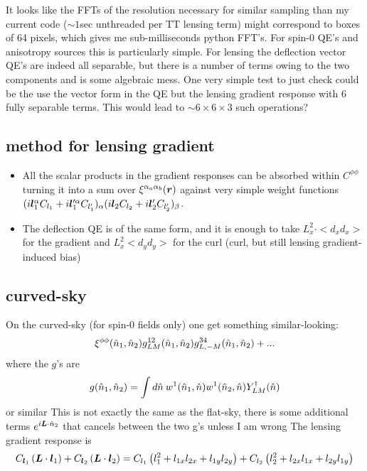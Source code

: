 \documentclass[11pt]{article}
\begin{document}
It looks like the FFTs of the resolution necessary for similar sampling than my current code ($\sim 1 $sec unthreaded per TT lensing term) might correspond to boxes of 64 pixels, which gives me sub-milliseconds python FFT's. 
For spin-0 QE's and anisotropy sources this is particularly simple. For lensing the deflection vector QE's are indeed all separable, but there is a number of terms owing to the two components and is some algebraic mess. One very simple test to just check could be the use the vector form in the QE but the lensing gradient response with 6 fully separable terms. This would lead to $\sim 6 \times 6 \times 3$ such operations?

\subsection{method for lensing gradient}
\begin{itemize}
\item All the scalar products in the gradient responses can be absorbed within $C^{\phi \phi}$ turning it into a sum over $\xi^{\alpha_a \alpha_b}(\boldsymbol{r})$ against very simple weight functions $(i \boldsymbol{l}^\alpha _1 C_{l_1} +i \boldsymbol{l}'^\alpha _1 C_{l'_1} )_\alpha(i \boldsymbol{l}_2 C_{l_2} +i \boldsymbol{l}'_2 C_{l'_2} )_\beta$.
\item The deflection QE is of the same form, and it is enough to take $L_x^2\cdot <d_x d_x>$ for the gradient and $L_x^2<d_yd_y>$ for the curl (curl, but still lensing gradient-induced bias)
\end{itemize}

\subsection{curved-sky}
On the curved-sky (for spin-0 fields only) one get something similar-looking:
\begin{equation}
\xi^{\phi\phi}({\hat n}_1,{\hat n}_2) g^{12}_{LM}({\hat n}_1,{\hat n}_2) g^{34}_{L,-M}({\hat n}_1,{\hat n}_2) + ...
\end{equation}
where the $g$'s are
\begin{equation}
	g({\hat n}_1, {\hat n}_2) = \int d{\hat n} \:w^1({\hat n}_1, {\hat n})w^1({\hat n}_2, {\hat n}) Y^\dagger_{LM}({\hat n})
\end{equation}
or similar
\color{red} This is not exactly the same as the flat-sky, there is some additional terms $e^{i \boldsymbol{L} \cdot {\hat n}_2}$ that cancels between the two g's unless I am wrong
\color{black}
The lensing gradient response is
\begin{equation}
	C_{\boldsymbol{l}_1} \left( \boldsymbol{L} \cdot \boldsymbol{l}_1 \right) + C_{\boldsymbol{l}_2} \left( \boldsymbol{L} \cdot \boldsymbol{l}_2 \right) = C_{l_1}\left( l_1^2  + l_{1x} l_{2x} + l_{1y} l_{2y}\right) + C_{l_2}\left( l_2^2  + l_{2x} l_{1x} + l_{2y} l_{1y}\right)
\end{equation}
\end{document}
